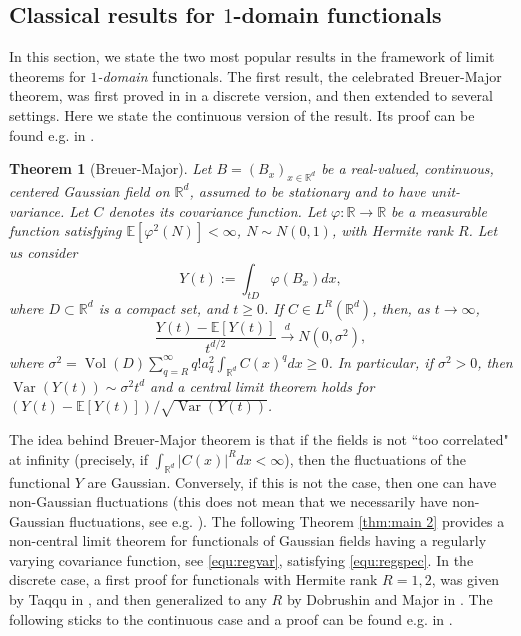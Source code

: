 \documentclass[12pt]{article}
\DeclareMathOperator{\var}{Var}
\DeclareMathOperator{\1}{1}
\DeclareMathOperator{\vol}{Vol}
\newcommand{\R}{\mathbb{R}}
\newcommand{\E}{\mathbb{E}}
\newcommand{\f}{\varphi}
\newcommand{\os}[2]{\overset{#1}{#2}}
\theoremstyle{plain}
\newtheorem{theorem}{Theorem}
\theoremstyle{definition}
\begin{document}
\subsection{Classical results for \texorpdfstring{$1$}{1}-domain functionals} \label{subsec:onedomain}
In this section, we state  the two most popular results in the framework of limit theorems for {\it $1$-domain} functionals. 
The first result, the celebrated Breuer-Major theorem, was first proved in \cite{BM83} in a discrete version, and then extended to several settings. Here we state the continuous version of the result. Its proof can be found e.g. in \cite{NZ19}.
\begin{theorem}[Breuer-Major]\label{thm:BM} Let $B=(B_x)_{x\in\R^d}$ be a real-valued, continuous, centered Gaussian field on $\R^d$, assumed to be stationary and to have unit-variance. Let $C$ denotes its covariance function. Let $\f:\R \rightarrow \R$ be a measurable function satisfying $\E[\varphi^2(N)]<\infty$, $N\sim N(0,1)$, with Hermite rank $R$. Let us consider \begin{equation}
Y(t):= \int_{tD} \f(B_x) dx,
\end{equation}
where $D\subset\R^d$ is a compact set, and $t\ge 0$. If $C\in L^R(\R^d)$,
then, as $t\to\infty$, \begin{equation}
\frac{Y(t)-\E[Y(t)]}{t^{d/2}}\os{d}{\longrightarrow} N(0,\sigma^2),
\end{equation}
where $\sigma^2=\vol(D) \sum_{q=R} ^{\infty} q! a_q^2 \int_{\R^d} C(x)^q dx \ge 0$. In particular, if $\sigma^2>0$, then $\var(Y(t)) \sim \sigma^2  t^d$ and a central limit theorem holds for $(Y(t)-\E[Y(t)])/\sqrt{\var(Y(t))}$.
\end{theorem}
The idea behind Breuer-Major theorem is that if the fields is not ``too correlated" at infinity (precisely, if $\int_{\R^d}|C(x)|^R dx<\infty$), then the fluctuations of the functional $Y$ are Gaussian. 
Conversely, if this is not the case, then one can have non-Gaussian fluctuations (this does not mean that we necessarily have non-Gaussian fluctuations, see e.g. \cite{MN22}).
The following Theorem \ref{thm:main 2} provides a non-central limit theorem for functionals of Gaussian fields having a regularly varying covariance function, see \eqref{equ:regvar}, satisfying \eqref{equ:regspec}. In the discrete case, a first proof for functionals with Hermite rank $R=1,2$, was given by Taqqu in \cite{Taq75}, and then generalized to any $R$ by Dobrushin and Major in \cite{DM79}. The following sticks to the continuous case and a proof can be found e.g. in \cite{LO14}.
\end{document}
